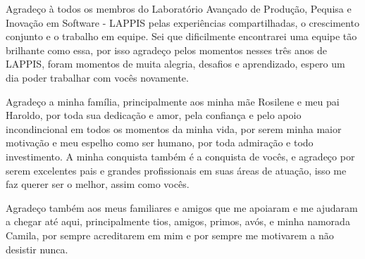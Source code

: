 \begin{agradecimentos}
Agradeço à todos os membros do Laboratório Avançado de Produção, Pequisa e
Inovação em Software - LAPPIS pelas experiências compartilhadas, o crescimento conjunto
 e o trabalho em equipe. Sei que dificilmente encontrarei uma equipe tão brilhante
como essa, por isso agradeço pelos momentos nesses três anos de LAPPIS, foram momentos de muita alegria,
desafios e aprendizado, espero um dia poder trabalhar com vocês novamente.

Agradeço a minha família, principalmente aos minha mãe Rosilene e meu pai Haroldo,
por toda sua dedicação e amor, pela confiança e pelo apoio incondincional em todos
os momentos da minha vida, por serem minha maior motivação e meu espelho como
ser humano, por toda admiração e todo investimento. A minha conquista também é
a conquista de vocês, e agradeço por serem excelentes pais e grandes profissionais em suas
áreas de atuação, isso me faz querer ser o melhor, assim como vocês.

Agradeço também aos meus familiares e amigos que me apoiaram e me ajudaram a chegar
até aqui, principalmente tios, amigos, primos, avós, e minha namorada Camila, por
sempre acreditarem em mim e por sempre me motivarem a não desistir nunca.
\end{agradecimentos}
